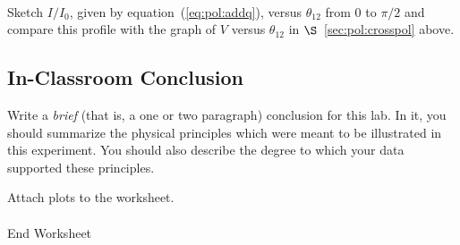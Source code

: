  \\
\clearpage
\noindent
Sketch $I/I_0$, given by equation~(\ref{eq:pol:addq}), versus $\theta_{12}$ 
from $0$ to $\pi/2$ and compare this profile with the graph of $V$ versus 
$\theta_{12}$ in $\S$~\ref{sec:pol:crosspol} above. 






\newpage
\subsection{In-Classroom Conclusion}

Write a {\it brief} (that is, a one or two paragraph) conclusion for
this lab. In it, you should summarize the physical
principles which were meant to be illustrated in this experiment. You
should also describe the degree to which your data supported these
principles.



\vfill
\noindent Attach plots to the worksheet. \\
\ \\
{\Large End Worksheet} 




\renewcommand{\thesection}{\thechapter.\arabic{section}}





